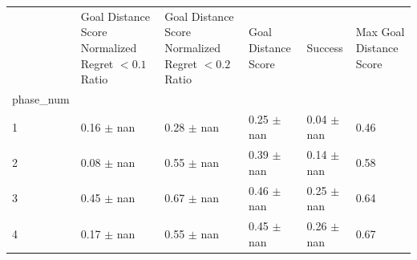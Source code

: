 \begin{tabular}{llllll}
\toprule
 & Goal Distance Score Normalized Regret $< 0.1$ Ratio & Goal Distance Score Normalized Regret $< 0.2$ Ratio & Goal Distance Score & Success & Max Goal Distance Score \\
phase_num &  &  &  &  &  \\
\midrule
1 & 0.16 $\pm$ nan & 0.28 $\pm$ nan & 0.25 $\pm$ nan & 0.04 $\pm$ nan & 0.46 \\
2 & 0.08 $\pm$ nan & 0.55 $\pm$ nan & 0.39 $\pm$ nan & 0.14 $\pm$ nan & 0.58 \\
3 & 0.45 $\pm$ nan & 0.67 $\pm$ nan & 0.46 $\pm$ nan & 0.25 $\pm$ nan & 0.64 \\
4 & 0.17 $\pm$ nan & 0.55 $\pm$ nan & 0.45 $\pm$ nan & 0.26 $\pm$ nan & 0.67 \\
\bottomrule
\end{tabular}
